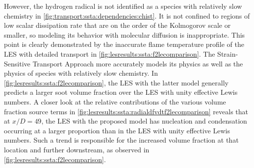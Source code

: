 However, the hydrogen radical is not identified as a species with relatively slow chemistry in \cref{fig:transport:ssta:dependencies:chist}. It is not confined to regions of low scalar dissipation rate that are on the order of the Kolmogorov scale or smaller, so modeling its behavior with molecular diffusion is inappropriate. This point is clearly demonstrated by the inaccurate flame temperature profile of the LES with detailed transport in \cref{fig:lesresults:ssta:f2lecomparison}. The Strain-Sensitive Transport Approach more accurately models its physics as well as the physics of species with relatively slow chemistry. In \cref{fig:lesresults:ssta:f2lecomparison}, the LES with the latter model generally predicts a larger soot volume fraction over the LES with unity effective Lewis numbers. A closer look at the relative contributions of the various volume fraction source terms in \cref{fig:lesresults:ssta:radialdfvdtf2lecomparison} reveals that at $x/D = 49$, the LES with the proposed model has nucleation and condensation occurring at a larger proportion than in the LES with unity effective Lewis numbers. Such a trend is responsible for the increased volume fraction at that location and further downstream, as observed in \cref{fig:lesresults:ssta:f2lecomparison}.


